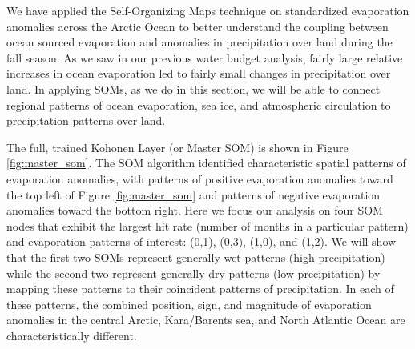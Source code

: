 
We have applied the Self-Organizing Maps technique on standardized evaporation anomalies across the Arctic Ocean to better understand the coupling between ocean sourced evaporation and anomalies in precipitation over land during the fall season.
As we saw in our previous water budget analysis, fairly large relative increases in ocean evaporation led to fairly small changes in precipitation over land.
In applying SOMs, as we do in this section, we will be able to connect regional patterns of ocean evaporation, sea ice, and atmospheric circulation to precipitation patterns over land.

The full, trained Kohonen Layer (or Master SOM) is shown in Figure \ref{fig:master_som}.
The SOM algorithm identified characteristic spatial patterns of evaporation anomalies, with patterns of positive evaporation anomalies toward the top left of Figure \ref{fig:master_som} and patterns of negative evaporation anomalies toward the bottom right.
Here we focus our analysis on four SOM nodes that exhibit the largest hit rate (number of months in a particular pattern) and evaporation patterns of interest: (0,1), (0,3), (1,0), and (1,2).
We will show that the first two SOMs represent generally wet patterns (high precipitation) while the second two represent generally dry patterns (low precipitation) by mapping these patterns to their coincident patterns of precipitation.
In each of these patterns, the combined position, sign, and magnitude of evaporation anomalies in the central Arctic, Kara/Barents sea, and North Atlantic Ocean are characteristically different.

